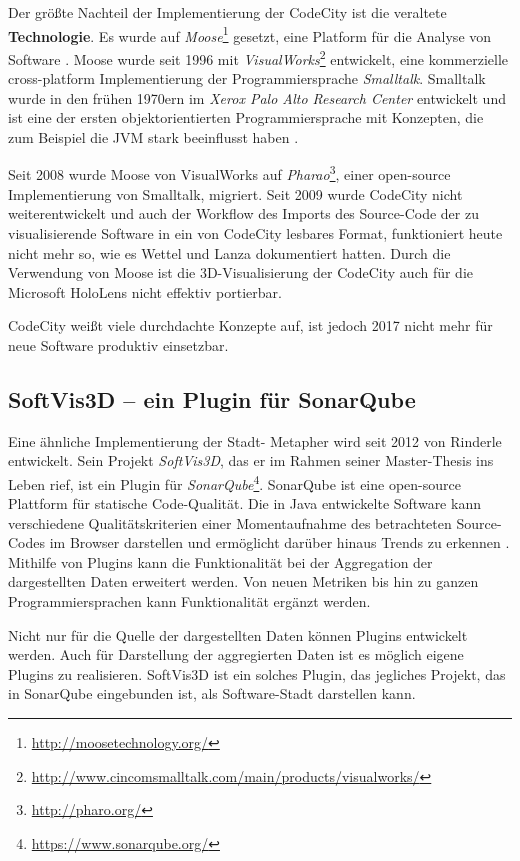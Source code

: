 Der größte Nachteil der Implementierung der CodeCity ist die veraltete \textbf{Technologie}. Es wurde auf \textit{Moose}\footnote{\url{http://moosetechnology.org/}} gesetzt, eine Platform für die Analyse von Software \cite{merrill1916moose}. Moose wurde seit 1996 mit \textit{VisualWorks}\footnote{\url{http://www.cincomsmalltalk.com/main/products/visualworks/}} entwickelt, eine kommerzielle cross-platform Implementierung der Programmiersprache \textit{Smalltalk}. Smalltalk wurde in den frühen 1970ern im \textit{Xerox Palo Alto Research Center} entwickelt und ist eine der ersten objektorientierten Programmiersprache mit Konzepten, die zum Beispiel die JVM stark beeinflusst haben \cite{goldberg1983smalltalk}.

Seit 2008 wurde Moose von VisualWorks auf \textit{Pharao}\footnote{\url{http://pharo.org/}}, einer open-source Implementierung von Smalltalk, migriert. Seit 2009 wurde CodeCity nicht weiterentwickelt und auch der Workflow des Imports des Source-Code der zu visualisierende Software in ein von CodeCity lesbares Format, funktioniert heute nicht mehr so, wie es Wettel und Lanza dokumentiert hatten. Durch die Verwendung von Moose ist die 3D-Visualisierung der CodeCity auch für die Microsoft HoloLens nicht effektiv portierbar.

CodeCity weißt viele durchdachte Konzepte auf, ist jedoch 2017 nicht mehr für neue Software produktiv einsetzbar.

\subsection{SoftVis3D -- ein Plugin für SonarQube}

Eine ähnliche Implementierung der Stadt- Metapher wird seit 2012 von Rinderle entwickelt. Sein Projekt \textit{SoftVis3D}, das er im Rahmen seiner Master-Thesis ins Leben rief, ist ein Plugin für \textit{SonarQube}\footnote{\url{https://www.sonarqube.org/}}. SonarQube ist eine open-source Plattform für statische Code-Qualität. Die in Java entwickelte Software kann verschiedene Qualitätskriterien einer Momentaufnahme des betrachteten Source-Codes im Browser darstellen und ermöglicht darüber hinaus Trends zu erkennen \cite{campbell2013sonarqube}. Mithilfe von Plugins kann die Funktionalität bei der Aggregation der dargestellten Daten erweitert werden. Von neuen Metriken bis hin zu ganzen Programmiersprachen kann Funktionalität ergänzt werden.

Nicht nur für die Quelle der dargestellten Daten können Plugins entwickelt werden. Auch für Darstellung der aggregierten Daten ist es möglich eigene Plugins zu realisieren. SoftVis3D ist ein solches Plugin, das jegliches Projekt, das in SonarQube eingebunden ist, als Software-Stadt darstellen kann.

